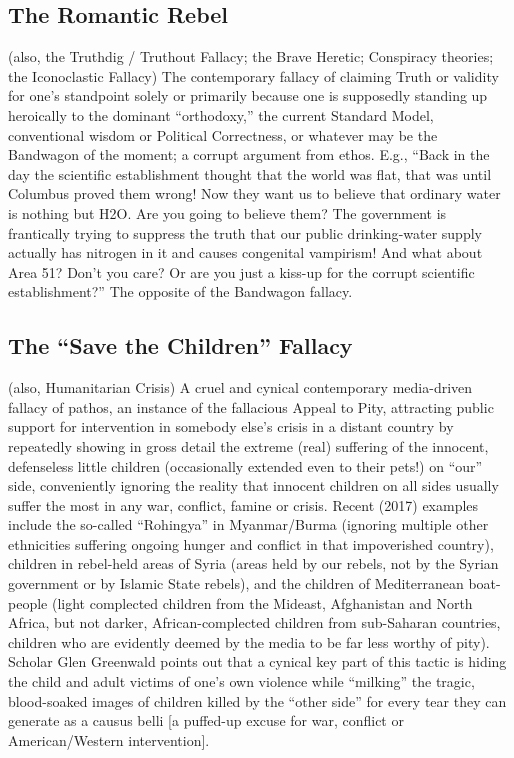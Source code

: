 \documentclass[10pt,a4paper,british]{article}
\begin{document}
\begin{multicols}{2}
    \subsection{The Romantic Rebel} (also, the Truthdig / Truthout Fallacy; the
    Brave Heretic; Conspiracy theories; the Iconoclastic Fallacy) The
    contemporary fallacy of claiming Truth or validity for one's standpoint
    solely or primarily because one is supposedly standing up heroically to the
    dominant ``orthodoxy,'' the current Standard Model, conventional wisdom or
    Political Correctness, or whatever may be the Bandwagon of the moment; a
    corrupt argument from ethos. E.g., ``Back in the day the scientific
    establishment thought that the world was flat, that was until Columbus
    proved them wrong!  Now they want us to believe that ordinary water is
    nothing but H2O. Are you going to believe them? The government is
    frantically trying to suppress the truth that our public drinking{-}water
    supply actually has nitrogen in it and causes congenital vampirism! And
    what about Area 51? Don't you care? Or are you just a kiss{-}up for the
    corrupt scientific establishment?'' The opposite of the Bandwagon fallacy.

	\subsection{The ``Save the Children'' Fallacy} (also, Humanitarian Crisis)
	A cruel and cynical contemporary media{-}driven fallacy of pathos, an
	instance of the fallacious Appeal to Pity, attracting public support for
	intervention in somebody else's crisis in a distant country by repeatedly
	showing in gross detail the extreme (real) suffering of the innocent,
	defenseless little children (occasionally extended even to their pets!) on
	``our'' side, conveniently ignoring the reality that innocent children on
	all sides usually suffer the most in any war, conflict, famine or crisis.
	Recent (2017) examples include the so{-}called ``Rohingya'' in
	Myanmar/Burma (ignoring multiple other ethnicities suffering ongoing hunger
	and conflict in that impoverished country), children in rebel{-}held areas
	of Syria (areas held by our rebels, not by the Syrian government or by
	Islamic State rebels), and the children of Mediterranean boat{-}people
	(light complected children from the Mideast, Afghanistan and North Africa,
	but not darker, African{-}complected children from sub{-}Saharan countries,
	children who are evidently deemed by the media to be far less worthy of
	pity). Scholar Glen Greenwald points out that a cynical key part of this
	tactic is hiding the child and adult victims of one's own violence while
	``milking'' the tragic, blood{-}soaked images of children killed by the
	``other side'' for every tear they can generate as a causus belli [a
	puffed{-}up excuse for war, conflict or American/Western intervention].


\end{multicols}
\end{document}
